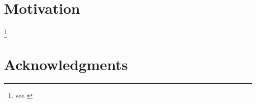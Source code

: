 

\section{Motivation}

\blindtext \footnote{see \cite{SS02}}

\section{Acknowledgments}

\blindtext